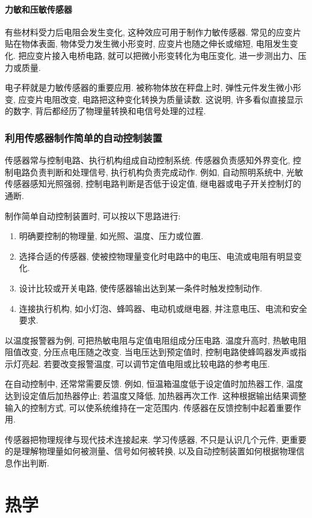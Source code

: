 \documentclass[UTF8,openany,fontset=fandol]{ctexbook}
\theoremstyle{chinesetextbook}
\begin{document}
\subsection{力敏和压敏传感器}
有些材料受力后电阻会发生变化, 这种效应可用于制作力敏传感器. 常见的应变片贴在物体表面, 物体受力发生微小形变时, 应变片也随之伸长或缩短, 电阻发生变化. 把应变片接入电桥电路, 就可以把微小形变转化为电压变化, 进一步测出力、压力或质量.

电子秤就是力敏传感器的重要应用. 被称物体放在秤盘上时, 弹性元件发生微小形变, 应变片电阻改变, 电路把这种变化转换为质量读数. 这说明, 许多看似直接显示的数字, 背后都经历了物理量转换和电信号处理的过程.
\section{利用传感器制作简单的自动控制装置}
传感器常与控制电路、执行机构组成自动控制系统. 传感器负责感知外界变化, 控制电路负责判断和处理信号, 执行机构负责完成动作. 例如, 自动照明系统中, 光敏传感器感知光照强弱, 控制电路判断是否低于设定值, 继电器或电子开关控制灯的通断.

制作简单自动控制装置时, 可以按以下思路进行:
\begin{enumerate}
\item 明确要控制的物理量, 如光照、温度、压力或位置.
\item 选择合适的传感器, 使被控物理量变化时电路中的电压、电流或电阻有明显变化.
\item 设计比较或开关电路, 使传感器输出达到某一条件时触发控制动作.
\item 连接执行机构, 如小灯泡、蜂鸣器、电动机或继电器, 并注意电压、电流和安全要求.
\end{enumerate}

以温度报警器为例, 可把热敏电阻与定值电阻组成分压电路. 温度升高时, 热敏电阻阻值改变, 分压点电压随之改变. 当电压达到预定值时, 控制电路使蜂鸣器发声或指示灯亮起. 若要改变报警温度, 可以调节定值电阻或比较电路的参考电压.

在自动控制中, 还常常需要反馈. 例如, 恒温箱温度低于设定值时加热器工作, 温度达到设定值后加热器停止; 若温度又降低, 加热器再次工作. 这种根据输出结果调整输入的控制方式, 可以使系统维持在一定范围内. 传感器在反馈控制中起着重要作用.

传感器把物理规律与现代技术连接起来. 学习传感器, 不只是认识几个元件, 更重要的是理解物理量如何被测量、信号如何被转换, 以及自动控制装置如何根据物理信息作出判断.
\part{热学}
\end{document}
